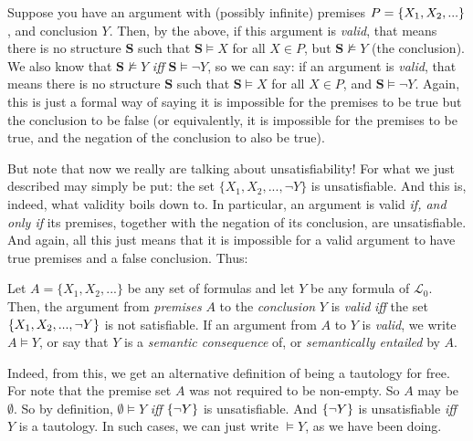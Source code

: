 Suppose you have an argument with (possibly infinite) premises $P=\{X_1, X_2, ...\}$, and conclusion $Y$. Then, by the above, if this argument is \textit{valid}, that means there is no structure $\mathbf{S}$ such that $\mathbf{S} \models X$ for all $X \in P$, but $\mathbf{S} \not\models Y$ (the conclusion). We also know that $\mathbf{S} \not\models Y$ \textit{iff} $\mathbf{S} \models \neg Y$, so we can say: if an argument is \textit{valid}, that means there is no structure $\mathbf{S}$ such that $\mathbf{S} \models X$ for all $X \in P$, and $\mathbf{S} \models \neg Y$. Again, this is just a formal way of saying it is impossible for the premises to be true but the conclusion to be false (or equivalently, it is impossible for the premises to be true, and the negation of the conclusion to also be true). 

But note that now we really are talking about unsatisfiability! For what we just described may simply be put: the set $\{X_1, X_2, ..., \neg Y\}$ is unsatisfiable. And this is, indeed, what validity boils down to. In particular, an argument is valid \textit{if, and only if} its premises, together with the negation of its conclusion, are unsatisfiable. And again, all this just means that it is impossible for a valid argument to have true premises and a false conclusion. Thus:

\begin{defn}[Validity]
Let $A=\{X_1, X_2, ...\}$ be any set of formulas and let $Y$ be any formula of $\mathcal{L}_0$. Then, the argument from \textit{premises} $A$ to the \textit{conclusion} $Y$ is \textit{valid} \textit{iff} the set $\{X_1, X_2, ..., \neg Y\}$ is not satisfiable. If an argument from $A$ to $Y$ is \textit{valid}, we write $A \models Y$, or say that $Y$ is a \textit{semantic consequence} of, or \textit{semantically entailed} by $A$.  
\end{defn}

\begin{remark}
Indeed, from this, we get an alternative definition of being a tautology for free. For note that the premise set $A$ was not required to be non-empty. So $A$ may be $\emptyset$. So by definition, $\emptyset \models Y$ \textit{iff} $\{\neg Y\}$ is unsatisfiable. And $\{\neg Y\}$ is unsatisfiable \textit{iff} $Y$ is a tautology. In such cases, we can just write $\models Y$, as we have been doing. 
\end{remark}

